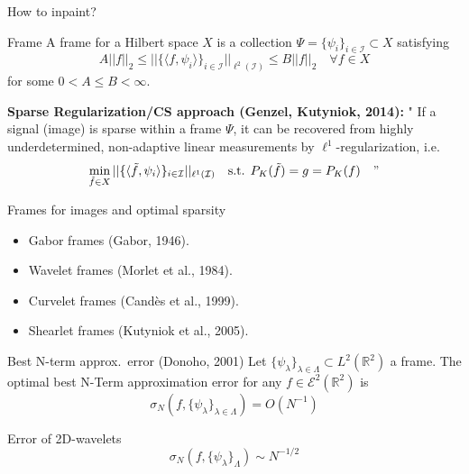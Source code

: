 \begin{frame}{How to inpaint?}
\begin{block}{Frame}
A frame for a Hilbert space $X$ is a collection $\Psi=\{\psi_i\}_{i\in\mathcal{I}}\subset X$ satisfying
$$
A ||f||_2\leq ||\{\langle f,\psi_i\rangle\}_{i\in\mathcal{I}}||_{\ell^2(\mathcal{I})}\leq B||f||_2  \quad \forall f\in X
$$
for some $0<A\leq B<\infty$.
\end{block}

\bigskip

\begin{block}{\textbf{Sparse Regularization/CS approach (Genzel, Kutyniok, 2014):}}
 " If a signal (image) is sparse within a frame $\Psi$, it can be recovered from highly underdetermined, non-adaptive linear measurements by $\ell^1$-regularization, i.e.
$$
\min_{\tilde{f}\in X}||\{\langle\tilde{f},\psi_i\rangle\}_{i\in\mathcal{I}}||_{\ell^1(\mathcal{I})} \quad \text{s.t. }P_K(\tilde{f})=g=P_K(f) \quad "
$$

\end{block}

\end{frame}

\begin{frame}{Frames for images and optimal sparsity}
\begin{itemize}
\item Gabor frames (Gabor, 1946).

\bigskip
\item Wavelet frames (Morlet et al., 1984).

\bigskip
\item Curvelet frames (Cand\`es et al., 1999).

\bigskip

\item Shearlet frames (Kutyniok et al., 2005).
\end{itemize}

\pause

\begin{block}{Best N-term approx.\ error (Donoho, 2001)}
Let $\{\psi_{\lambda}\}_{\lambda\in\Lambda}\subset L^2(\mathbb{R}^2)$ a frame. The optimal best N-Term approximation error for any $f\in\mathcal{E}^2(\mathbb{R}^2)$ is
$$
\sigma_N(f,\{\psi_{\lambda}\}_{\lambda\in\Lambda})=O(N^{-1})
$$
\end{block}
\pause
\begin{block}{Error of 2D-wavelets}
$$
\sigma_N(f,\{\psi_{\lambda}\}_{\Lambda})\sim N^{-1/2}
$$
\end{block}
\end{frame}

